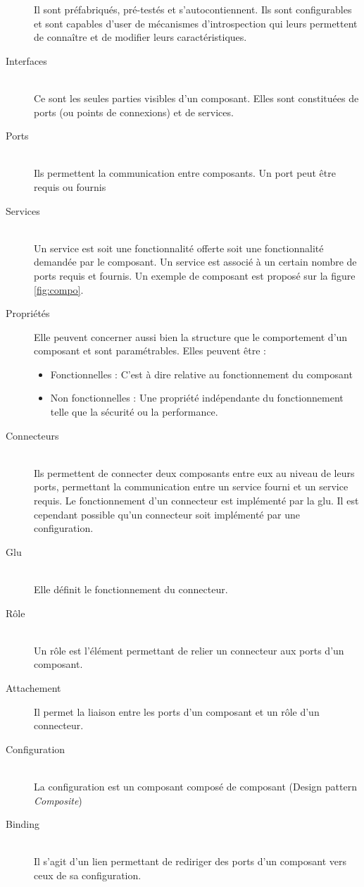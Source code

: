 \begin{description}
 Il sont préfabriqués, pré-testés et s'autocontiennent. Ils sont configurables et sont capables d'user de mécanismes d'introspection qui leurs permettent de connaître et de modifier leurs caractéristiques.
\item[Interfaces] \hfill \\
  Ce sont les seules parties visibles d'un composant. Elles sont constituées de ports (ou points de connexions) et de services.
\item[Ports]\hfill \\
  Ils permettent la communication entre composants. Un port peut être requis ou fournis  
\item[Services] \hfill \\ Un service est soit une fonctionnalité offerte soit une fonctionnalité demandée  par le composant. Un service est associé à un certain nombre de ports requis et fournis. Un exemple de composant est proposé sur la figure \ref{fig:compo}.
\item[Propriétés]  Elle peuvent concerner aussi bien la structure que le comportement d'un composant et sont paramétrables. Elles peuvent être :
  \begin{itemize}
  \item 
    Fonctionnelles : C'est à dire relative au fonctionnement du composant
  \item 
    Non fonctionnelles : Une propriété indépendante du fonctionnement telle que la sécurité ou la performance.
  \end{itemize}
\item[Connecteurs] \hfill \\
	Ils permettent de connecter deux composants entre eux au niveau de leurs ports, permettant la communication entre un service fourni et un service requis. Le fonctionnement d'un connecteur est implémenté par la glu. Il est cependant possible qu'un connecteur soit implémenté par une configuration.
	\item[Glu] \hfill \\
	Elle définit le fonctionnement du connecteur.
	\item[Rôle] \hfill \\
	Un rôle est l'élément permettant de relier un connecteur aux ports d'un composant.
	\item[Attachement]
	Il permet la liaison entre les ports d'un composant et un rôle d'un connecteur.
\item[Configuration] \hfill \\
	La configuration est un composant composé de composant (Design pattern \emph{Composite})
	\item[Binding] \hfill \\
	Il s'agit d'un lien permettant de rediriger des ports d'un composant vers ceux de sa configuration.

\end{description}

